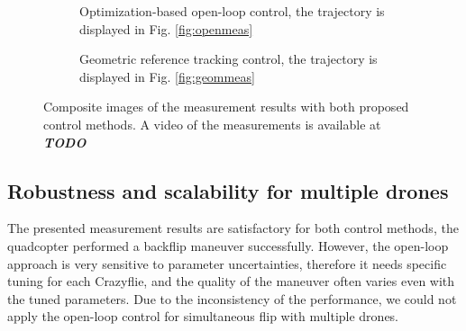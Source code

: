 \begin{figure}
\setlength{\fboxsep}{0pt}%
\setlength{\fboxrule}{1pt}
\centering
\begin{subfigure}{.45\textwidth}
  \centering
  \caption{Optimization-based open-loop control, the trajectory is displayed in Fig. \ref{fig:openmeas}}
  \label{fig:sub1}
\end{subfigure}%
\hspace{1cm}
\begin{subfigure}{.45\textwidth}
  \centering
  \caption{Geometric reference tracking control, the trajectory is displayed in Fig. \ref{fig:geommeas}}
  \label{fig:sub2}
\end{subfigure}
\caption{Composite images of the measurement results with both proposed control methods. A video of the measurements is available at \textit{\textbf{TODO}}}
\label{fig:test}
\end{figure}

\subsection{Robustness and scalability for multiple drones}
The presented measurement results are satisfactory for both control methods, the quadcopter performed a backflip maneuver successfully. However, the open-loop approach is very sensitive to parameter uncertainties, therefore it needs specific tuning for each Crazyflie, and the quality of the maneuver often varies even with the tuned parameters. Due to the inconsistency of the performance, we could not apply the open-loop control for simultaneous flip with multiple drones.

